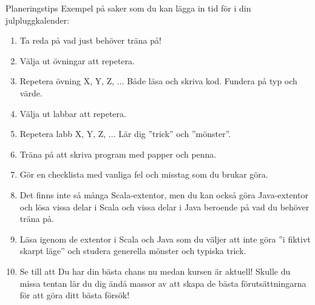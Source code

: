 \begin{Slide}{Planeringstips}\SlideFontTiny
Exempel på saker som du kan lägga in tid för i din julpluggkalender:
\begin{enumerate}
\item Ta reda på vad just  behöver träna på!
\item Välja ut övningar att repetera.
\item Repetera övning X, Y, Z, ... Både läsa och skriva kod. Fundera på typ och värde.
\item Välja ut labbar att repetera.
\item Repetera labb X, Y, Z, ... Lär dig ''trick'' och ''mönster''.
\item Träna på att skriva program med papper och penna.
\item Gör en checklista med vanliga fel och misstag som du brukar göra.
\item Det finns inte så många Scala-extentor, men du kan också göra Java-extentor och lösa vissa delar i Scala och vissa delar i Java beroende på vad du behöver träna på.

\item Läsa igenom de extentor i Scala och Java som du väljer att inte göra ''i fiktivt skarpt läge'' och studera generella mönster och typiska trick.
\item Se till att  Du har din bästa chans nu medan kursen är aktuell! Skulle du missa tentan lär du dig ändå massor av att skapa de bästa förutsättningarna för att göra ditt bästa försök!
\end{enumerate}
\end{Slide}

